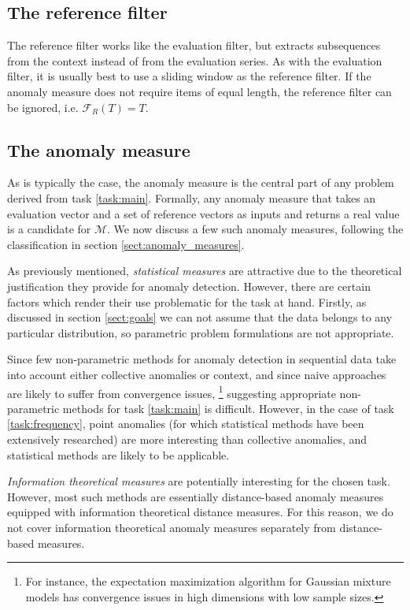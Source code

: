 \subsection{The reference filter}

The reference filter works like the evaluation filter, but extracts subsequences from the context instead of from the evaluation series. As with the evaluation filter, it is usually best to use a sliding window as the reference filter. If the anomaly measure does not require items of equal length, the reference filter can be ignored, i.e. $\mathcal{F}_R(T) = T$.

\subsection{The anomaly measure}

As is typically the case, the anomaly measure is the central part of any problem derived from task \ref{task:main}. Formally, any anomaly measure that takes an evaluation vector and a set of reference vectors as inputs and returns a real value is a candidate for $\mathcal{M}$. We now discuss a few such anomaly measures, following the classification in section \ref{sect:anomaly_measures}.

As previously mentioned, \emph{statistical measures} are attractive due to the theoretical justification they provide for anomaly detection. However, there are certain factors which render their use problematic for the task at hand. Firstly, as discussed in section \ref{sect:goals} we can not assume that the data belongs to any particular distribution, so parametric problem formulations are not appropriate. 

Since few non-parametric methods for anomaly detection in sequential data take into account either collective anomalies or context, and since naive approaches are likely to suffer from convergence issues, \footnote{For instance, the expectation maximization algorithm for Gaussian mixture models has convergence issues in high dimensions with low sample sizes.} suggesting appropriate non-parametric methods for task \ref{task:main} is difficult. However, in the case of task \ref{task:frequency}, point anomalies (for which statistical methods have been extensively researched) are more interesting than collective anomalies, and statistical methods are likely to be applicable.

\emph{Information theoretical measures} are potentially interesting for the chosen task. However, most such methods are essentially distance-based anomaly measures equipped with information theoretical distance measures. For this reason, we do not cover information theoretical anomaly measures separately from distance-based measures.

